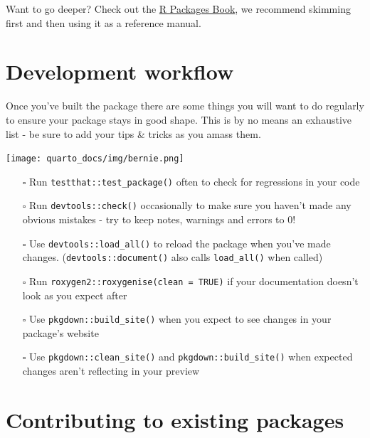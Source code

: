 \documentclass[
  letterpaper,
  DIV=11,
  numbers=noendperiod]{scrreprt}
\providecommand{\tightlist}{%
  \setlength{\itemsep}{0pt}\setlength{\parskip}{0pt}}\usepackage{longtable,booktabs,array}
\begin{document}
Want to go deeper? Check out the \href{https://r-pkgs.org/}{R Packages
Book}, we recommend skimming first and then using it as a reference
manual.

\section{Development workflow}\label{development-workflow}

Once you've built the package there are some things you will want to do
regularly to ensure your package stays in good shape. This is by no
means an exhaustive list - be sure to add your tips \& tricks as you
amass them.

\texttt{[image: quarto\_docs/img/bernie.png]}

\begin{itemize}
\tightlist
\item[$\square$]
  Run \texttt{testthat::test\_package()} often to check for regressions
  in your code
\item[$\square$]
  Run \texttt{devtools::check()} occasionally to make sure you haven't
  made any obvious mistakes - try to keep notes, warnings and errors to
  0!
\item[$\square$]
  Use \texttt{devtools::load\_all()} to reload the package when you've
  made changes. (\texttt{devtools::document()} also calls
  \texttt{load\_all()} when called)
\item[$\square$]
  Run \texttt{roxygen2::roxygenise(clean\ =\ TRUE)} if your
  documentation doesn't look as you expect after
\item[$\square$]
  Use \texttt{pkgdown::build\_site()} when you expect to see changes in
  your package's website
\item[$\square$]
  Use \texttt{pkgdown::clean\_site()} and
  \texttt{pkgdown::build\_site()} when expected changes aren't
  reflecting in your preview
\end{itemize}

\section{Contributing to existing
packages}\label{contributing-to-existing-packages}
\end{document}
